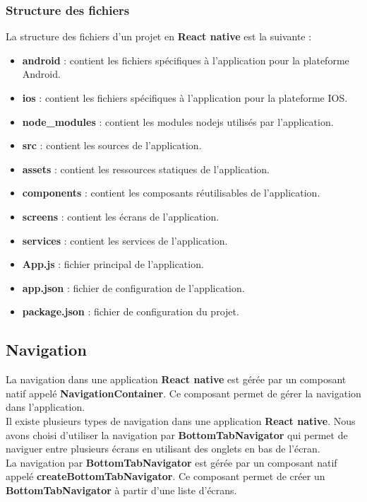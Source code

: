 \documentclass[12pt]{article}
\begin{document}
    \subsubsection{Structure des fichiers}{\label{subsubsec:structure}}
    La structure des fichiers d'un projet en \textbf{React native} est la suivante :
    \begin{itemize}
        \item \textbf{android} : contient les fichiers spécifiques à l'application pour la plateforme Android.
        \item \textbf{ios} : contient les fichiers spécifiques à l'application pour la plateforme IOS.
        \item \textbf{node_modules} : contient les modules nodejs utilisés par l'application.
        \item \textbf{src} : contient les sources de l'application.
        \item \textbf{assets} : contient les ressources statiques de l'application.
        \item \textbf{components} : contient les composants réutilisables de l'application.
        \item \textbf{screens} : contient les écrans de l'application.
        \item \textbf{services} : contient les services de l'application.
        \item \textbf{App.js} : fichier principal de l'application.
        \item \textbf{app.json} : fichier de configuration de l'application.
        \item \textbf{package.json} : fichier de configuration du projet.
    \end{itemize}

    \subsection{Navigation}{\label{subsec:navigation}}
    La navigation dans une application \textbf{React native} est gérée par un composant natif appelé \textbf{NavigationContainer}.
    Ce composant permet de gérer la navigation dans l'application.\\
    Il existe plusieurs types de navigation dans une application \textbf{React native}. Nous avons choisi d'utiliser
    la navigation par \textbf{BottomTabNavigator} qui permet de naviguer entre plusieurs écrans en utilisant des
    onglets en bas de l'écran.\\
    La navigation par \textbf{BottomTabNavigator} est gérée par un composant natif appelé \textbf{createBottomTabNavigator}.
    Ce composant permet de créer un \textbf{BottomTabNavigator} à partir d'une liste d'écrans.\\
\end{document}
